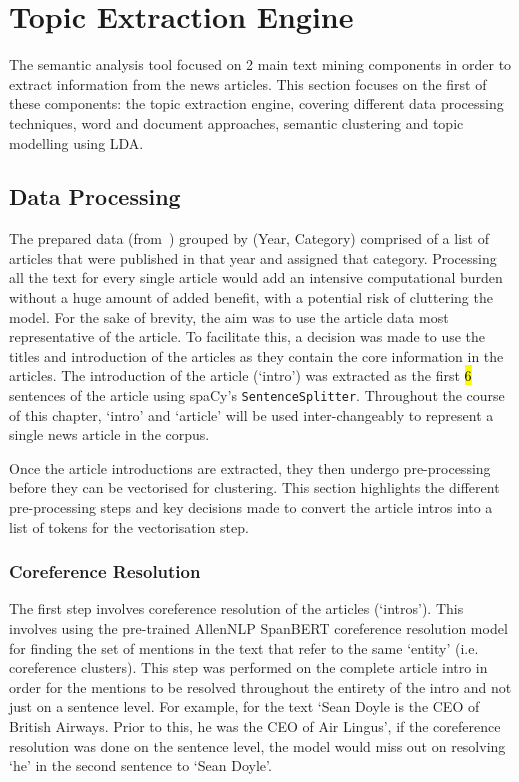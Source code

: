 \chapter{Topic Extraction Engine}

The semantic analysis tool focused on 2 main text mining components in order to extract information from the news articles. This section focuses on the first of these components: the topic extraction engine, covering different data processing techniques, word and document approaches, semantic clustering and topic modelling using LDA. 

\section{Data Processing} \label{s:procesing_topic_engine}

The prepared data (from~) grouped by (Year, Category) comprised of a list of articles that were published in that year and assigned that category. Processing all the text for every single article would add an intensive computational burden without a huge amount of added benefit, with a potential risk of cluttering the model. For the sake of brevity, the aim was to use the article data most representative of the article. To facilitate this, a decision was made to use the titles and introduction of the articles as they contain the core information in the articles. The introduction of the article (`intro') was extracted as the first \hl{6} sentences of the article using spaCy's \texttt{SentenceSplitter}. Throughout the course of this chapter, `intro' and `article' will be used inter-changeably to represent a single news article in the corpus. 

Once the article introductions are extracted, they then undergo pre-processing before they can be vectorised for clustering. This section highlights the different pre-processing steps and key decisions made to convert the article intros into a list of tokens for the vectorisation step.

\subsection*{Coreference Resolution} \label{coref}
The first step involves coreference resolution of the articles (`intros'). This involves using the pre-trained AllenNLP SpanBERT coreference resolution model for finding the set of mentions in the text that refer to the same `entity' (i.e. coreference clusters). This step was performed on the complete article intro in order for the mentions to be resolved throughout the entirety of the intro and not just on a sentence level. For example, for the text `Sean Doyle is the CEO of British Airways. Prior to this, he was the CEO of Air Lingus', if the coreference resolution was done on the sentence level, the model would miss out on resolving `he' in the second sentence to `Sean Doyle'.

